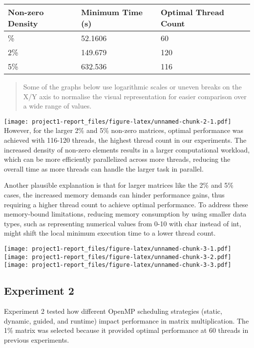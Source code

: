 \documentclass[
]{article}
\begin{document}
\begin{longtable}[]{@{}lll@{}}
\toprule\noalign{}
Non-zero Density & Minimum Time (s) & Optimal Thread Count \\
\midrule\noalign{}
\endhead
\bottomrule\noalign{}
\endlastfoot
1\% & 52.1606 & 60 \\
2\% & 149.679 & 120 \\
5\% & 632.536 & 116 \\
\end{longtable}

\begin{quote}
Some of the graphs below use logarithmic scales or uneven breaks on the
X/Y axis to normalise the visual representation for easier comparison
over a wide range of values.
\end{quote}

\texttt{[image: project1-report\_files/figure-latex/unnamed-chunk-2-1.pdf]}
However, for the larger 2\% and 5\% non-zero matrices, optimal
performance was achieved with 116-120 threads, the highest thread count
in our experiments. The increased density of non-zero elements results
in a larger computational workload, which can be more efficiently
parallelized across more threads, reducing the overall time as more
threads can handle the larger task in parallel.

Another plausible explanation is that for larger matrices like the 2\%
and 5\% cases, the increased memory demands can hinder performance
gains, thus requiring a higher thread count to achieve optimal
performance. To address these memory-bound limitations, reducing memory
consumption by using smaller data types, such as representing numerical
values from 0-10 with char instead of int, might shift the local minimum
execution time to a lower thread count.

\texttt{[image: project1-report\_files/figure-latex/unnamed-chunk-3-1.pdf]}
\texttt{[image: project1-report\_files/figure-latex/unnamed-chunk-3-2.pdf]}
\texttt{[image: project1-report\_files/figure-latex/unnamed-chunk-3-3.pdf]}

\subsection{Experiment 2}\label{experiment-2}

Experiment 2 tested how different OpenMP scheduling strategies (static,
dynamic, guided, and runtime) impact performance in matrix
multiplication. The 1\% matrix was selected because it provided optimal
performance at 60 threads in previous experiments.
\end{document}
